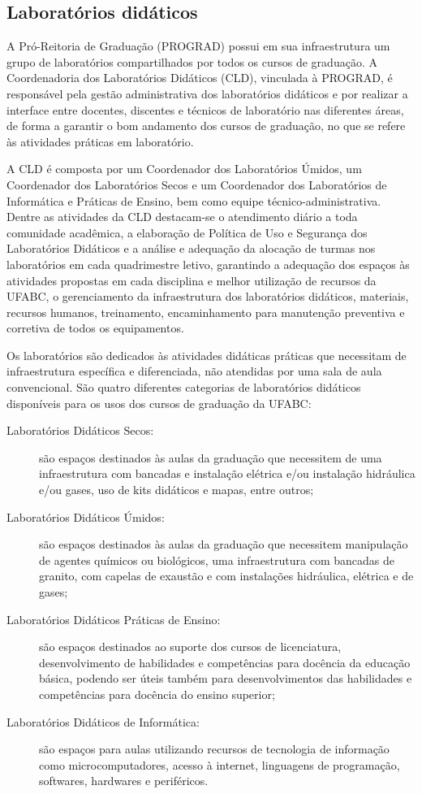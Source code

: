 \subsection{Laboratórios didáticos}

A Pró-Reitoria de Graduação (PROGRAD) possui em sua infraestrutura um grupo de
laboratórios compartilhados por todos os cursos de graduação. 
A Coordenadoria dos Laboratórios Didáticos (CLD), vinculada à PROGRAD, é
responsável pela gestão administrativa dos laboratórios didáticos e por
realizar a interface entre docentes, discentes e técnicos de laboratório nas
diferentes áreas, de forma a garantir o bom andamento dos cursos de graduação,
no que se refere às atividades práticas em laboratório.

A CLD é composta por um Coordenador dos Laboratórios Úmidos, um Coordenador dos
Laboratórios Secos e um Coordenador dos Laboratórios de Informática e Práticas
de Ensino, bem como equipe técnico-administrativa. 
Dentre as atividades da CLD destacam-se o atendimento diário a toda comunidade
acadêmica, a elaboração de Política de Uso e Segurança dos Laboratórios
Didáticos e a análise e adequação da alocação de turmas nos laboratórios em
cada quadrimestre letivo, garantindo a adequação dos espaços às atividades
propostas em cada disciplina e melhor utilização de recursos da UFABC, o
gerenciamento da infraestrutura dos laboratórios didáticos, materiais, recursos
humanos, treinamento, encaminhamento para manutenção preventiva e corretiva de
todos os equipamentos. 

Os laboratórios são dedicados às atividades didáticas práticas que necessitam
de infraestrutura específica e diferenciada, não atendidas por uma sala de aula
convencional. 
São quatro diferentes categorias de laboratórios didáticos disponíveis para os
usos dos cursos de graduação da UFABC: 
\begin{description}
    \item[Laboratórios Didáticos Secos:] são espaços destinados às aulas da
    graduação que necessitem de uma infraestrutura com bancadas e instalação
    elétrica e/ou instalação hidráulica e/ou gases, uso de kits didáticos e
    mapas, entre outros;
    \item[Laboratórios Didáticos Úmidos:] são espaços destinados às aulas da
    graduação que necessitem manipulação de agentes químicos ou biológicos, uma
    infraestrutura com bancadas de granito, com capelas de exaustão e com
    instalações hidráulica, elétrica e de gases;
    \item[Laboratórios Didáticos Práticas de Ensino:] são espaços destinados ao
    suporte dos cursos de licenciatura, desenvolvimento de habilidades e
    competências para docência da educação básica, podendo ser úteis também
    para desenvolvimentos das habilidades e competências para docência do
    ensino superior;
    \item[Laboratórios Didáticos de Informática:] são espaços para aulas
    utilizando recursos de tecnologia de informação como microcomputadores,
    acesso à internet, linguagens de programação, softwares, hardwares e
    periféricos.
\end{description}

